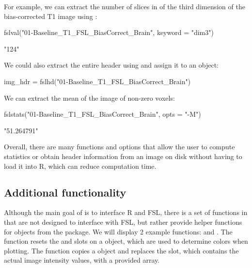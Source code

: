 For example, we can extract the number of slices in of the third dimension of the bias-corrected T1 image using :
\begin{Schunk}
\begin{Sinput}
fslval("01-Baseline_T1_FSL_BiasCorrect_Brain", keyword = "dim3")
\end{Sinput}
\end{Schunk}
\gobblepars
\begin{Schunk}
\begin{Soutput}
[1] "124"
\end{Soutput}
\end{Schunk}

We could also extract the entire header using  and assign it to an object:
\begin{Schunk}
\begin{Sinput}
img_hdr = fslhd("01-Baseline_T1_FSL_BiasCorrect_Brain")
\end{Sinput}
\end{Schunk}

We can extract the mean of the image of non-zero voxels:
\begin{Schunk}
\begin{Sinput}
fslstats("01-Baseline_T1_FSL_BiasCorrect_Brain", opts = "-M")
\end{Sinput}
\end{Schunk}
\gobblepars
\begin{Schunk}
\begin{Soutput}
[1] "51.264791"
\end{Soutput}
\end{Schunk}

Overall, there are many functions and options that allow the user to compute statistics or obtain header information from an image on disk without having to load it into R, which can reduce computation time.  

\subsection{Additional  functionality}

Although the main goal of  is to interface R and FSL, there is a set of functions in  that are not designed to interface with FSL, but rather provide helper functions for  objects from the  package.  We will display 2 example functions:  and .  The  function resets the  and  slots on a  object, which are used to determine colors when plotting.  The  function copies a  object and replaces the  slot, which contains the actual image intensity values, with a provided array. 

